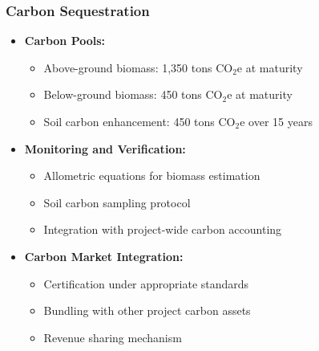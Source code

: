 \subsubsection{Carbon Sequestration}
\begin{itemize}
    \item \textbf{Carbon Pools:}
    \begin{itemize}
        \item Above-ground biomass: 1,350 tons CO$_2$e at maturity
        \item Below-ground biomass: 450 tons CO$_2$e at maturity
        \item Soil carbon enhancement: 450 tons CO$_2$e over 15 years
    \end{itemize}
    \item \textbf{Monitoring and Verification:}
    \begin{itemize}
        \item Allometric equations for biomass estimation
        \item Soil carbon sampling protocol
        \item Integration with project-wide carbon accounting
    \end{itemize}
    \item \textbf{Carbon Market Integration:}
    \begin{itemize}
        \item Certification under appropriate standards
        \item Bundling with other project carbon assets
        \item Revenue sharing mechanism
    \end{itemize}
\end{itemize}

